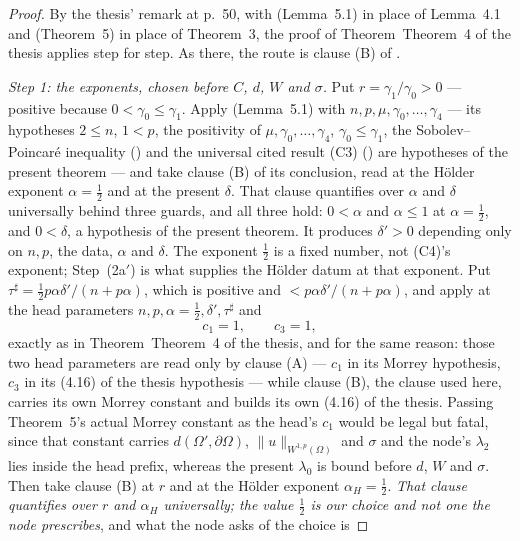 \begin{proof}
By the thesis' remark at p.~50, with 
(Lemma~5.1) in place of Lemma~4.1 and 
(Theorem~5) in place of Theorem~3, the proof of Theorem~Theorem~4 of the thesis applies step
for step.  As there, the route is clause (B) of
.

\emph{Step 1: the exponents, chosen before $C$, $d$, $W$ and $\sigma$.}  Put
$r=\gamma_1/\gamma_0>0$ --- positive because $0<\gamma_0\le\gamma_1$.  Apply
 (Lemma~5.1) with
$n,p,\mu,\gamma_0,\dots,\gamma_4$ --- its hypotheses $2\le n$, $1<p$, the
positivity of $\mu,\gamma_0,\dots,\gamma_4$, $\gamma_0\le\gamma_1$, the
Sobolev--Poincar\'e inequality () and the
universal cited result (C3) () are hypotheses of
the present theorem --- and take clause (B) of its conclusion, read at the
H\"older exponent $\alpha=\tfrac12$ and at the present $\delta$.  That clause
quantifies over $\alpha$ and $\delta$ universally behind three guards, and all
three hold: $0<\alpha$ and $\alpha\le1$ at $\alpha=\tfrac12$, and $0<\delta$, a
hypothesis of the present theorem.  It produces
$\delta'>0$ depending only on $n,p$, the data, $\alpha$ and $\delta$.  The
exponent $\tfrac12$ is a fixed number, not (C4)'s exponent; Step~(2a$'$) is what
supplies the H\"older datum at that exponent.  Put
$\tau^\sharp=\tfrac12p\alpha\delta'/(n+p\alpha)$, which is positive and
$<p\alpha\delta'/(n+p\alpha)$, and apply
 at the head parameters
$n,p,\alpha=\tfrac12,\delta',\tau^\sharp$ and
\[
c_1=1,\qquad c_3=1 ,
\]
exactly as in Theorem~Theorem~4 of the thesis, and for the same reason: those two head
parameters are read only by clause (A) --- $c_1$ in its Morrey hypothesis, $c_3$
in its (4.16) of the thesis hypothesis --- while clause (B), the clause used here,
carries its own Morrey constant and builds its own (4.16) of the thesis.  Passing
Theorem~5's actual Morrey constant as the head's $c_1$ would be legal but fatal,
since that constant carries $d(\Omega',\partial\Omega)$, $\|u\|_{W^{1,p}(\Omega)}$
and $\sigma$ and the node's $\lambda_2$ lies inside the head prefix, whereas the
present $\lambda_0$ is bound before $d$, $W$ and $\sigma$.  Then take clause
(B) at $r$ and at the H\"older exponent $\alpha_H=\tfrac12$.  \emph{That clause
quantifies over $r$ and $\alpha_H$ universally; the value $\tfrac12$ is our
choice and not one the node prescribes}, and what the node asks of the choice is

\end{proof}
